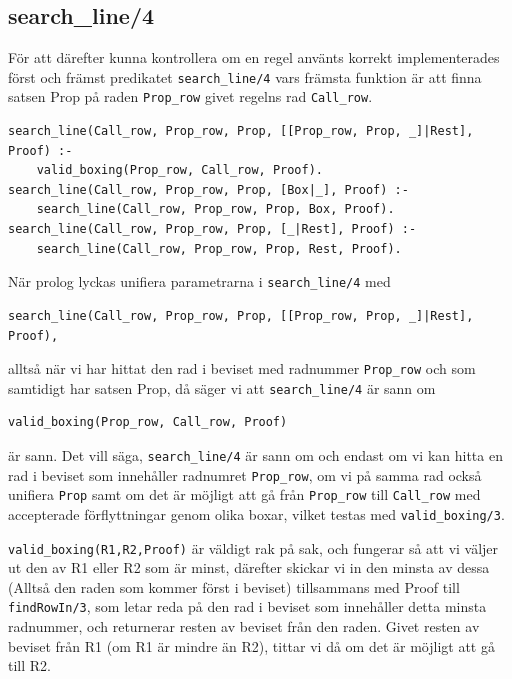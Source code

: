 \documentclass[a4paper]{article}
\begin{document}
\subsection{search\_line/4} \label{subsec:searchline}
För att därefter kunna kontrollera om en regel använts korrekt implementerades först och främst predikatet \texttt{search_line/4} vars främsta funktion är att finna satsen Prop på raden \texttt{Prop_row} givet regelns rad \texttt{Call_row}. 

\begin{verbatim}
search_line(Call_row, Prop_row, Prop, [[Prop_row, Prop, _]|Rest], Proof) :- 
	valid_boxing(Prop_row, Call_row, Proof).
search_line(Call_row, Prop_row, Prop, [Box|_], Proof) :-
	search_line(Call_row, Prop_row, Prop, Box, Proof).
search_line(Call_row, Prop_row, Prop, [_|Rest], Proof) :-
	search_line(Call_row, Prop_row, Prop, Rest, Proof).
\end{verbatim}

När prolog lyckas unifiera parametrarna i \texttt{search_line/4} med 
\begin{verbatim}
search_line(Call_row, Prop_row, Prop, [[Prop_row, Prop, _]|Rest], Proof),
\end{verbatim}
alltså när vi har hittat den rad i beviset med radnummer \texttt{Prop_row} och som samtidigt har satsen Prop, då säger vi att \texttt{search_line/4} är sann om 
\begin{verbatim}
valid_boxing(Prop_row, Call_row, Proof)
\end{verbatim}
är sann. Det vill säga, \texttt{search_line/4} är sann om och endast om vi kan hitta en rad i beviset som innehåller radnumret \texttt{Prop_row}, om vi på samma rad också unifiera \texttt{Prop} samt om det är möjligt att gå från \texttt{Prop_row} till \texttt{Call_row} med accepterade förflyttningar genom olika boxar, vilket testas med \texttt{valid_boxing/3}.

\texttt{valid_boxing(R1,R2,Proof)} är väldigt rak på sak, och fungerar så att vi väljer ut den av R1 eller R2 som är minst, därefter skickar vi in den minsta av dessa (Alltså den raden som kommer först i beviset) tillsammans med Proof till \texttt{findRowIn/3}, som letar reda på den rad i beviset som innehåller detta minsta radnummer, och returnerar resten av beviset från den raden. Givet resten av beviset från R1 (om R1 är mindre än R2), tittar vi då om det är möjligt att gå till R2.
\end{document}

